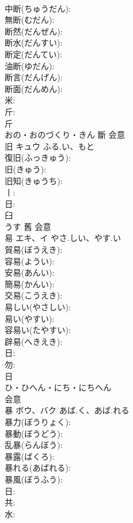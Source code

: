 \documentclass[8pt]{extreport}
\begin{document}
\begin{CJK}{UTF8}{min}
\\	中断(ちゅうだん): 
\\	無断(むだん): 
\\	断然(だんぜん): 
\\	断水(だんすい): 
\\	断定(だんてい): 
\\	油断(ゆだん): 
\\	断言(だんげん): 
\\	断面(だんめん): 
\\	米: 
\\	斤: 
\\	斤	
\\	おの・おのづくり・きん	斷	会意 
\\	旧	キュウ	ふる.い、もと		
\\	復旧(ふっきゅう): 
\\	旧(きゅう): 
\\	旧知(きゅうち): 
\\	丨: 
\\	日: 
\\	臼	
\\	うす	舊	会意 
\\	易	エキ、イ	やさ.しい、やす.い		
\\	貿易(ぼうえき): 
\\	容易(ようい): 
\\	安易(あんい): 
\\	簡易(かんい): 
\\	交易(こうえき): 
\\	易しい(やさしい): 
\\	易い(やすい): 
\\	容易い(たやすい): 
\\	辟易(へきえき): 
\\	日: 
\\	勿: 
\\	日	
\\	ひ・ひへん・にち・にちへん	
\\	会意 
\\	暴	ボウ、バク	あば.く、あば.れる		
\\	暴力(ぼうりょく): 
\\	暴動(ぼうどう): 
\\	乱暴(らんぼう): 
\\	暴露(ばくろ): 
\\	暴れる(あばれる): 
\\	暴風(ぼうふう): 
\\	日: 
\\	共: 
\\	水: 

\end{CJK}
\end{document}
